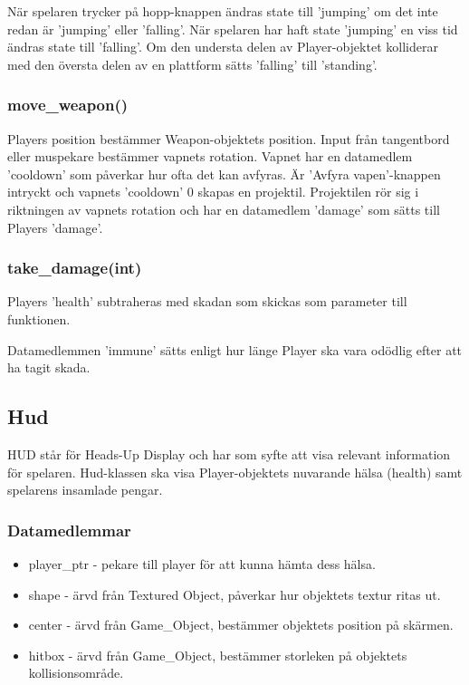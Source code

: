 \documentclass{TDP005mall}
\begin{document}
När spelaren trycker på hopp-knappen ändras state till 'jumping' om det inte redan är 'jumping' eller 'falling'.
När spelaren har haft state 'jumping' en viss tid ändras state till 'falling'.
Om den understa delen av Player-objektet kolliderar med den översta delen av en plattform sätts 'falling' till 'standing'.

\subsubsection{move\_weapon()}
Players position bestämmer Weapon-objektets position. 
Input från tangentbord eller muspekare bestämmer vapnets rotation.
Vapnet har en datamedlem 'cooldown' som påverkar hur ofta det kan avfyras. 
Är 'Avfyra vapen'-knappen intryckt och vapnets 'cooldown' 0 skapas en projektil.
Projektilen rör sig i riktningen av vapnets rotation och har en datamedlem 'damage' som sätts till Players 'damage'.

\subsubsection{take\_damage(int)}
Players 'health' subtraheras med skadan som skickas som parameter till funktionen. 

Datamedlemmen 'immune' sätts enligt hur länge Player ska vara odödlig efter att ha tagit skada.


\subsection{Hud}
HUD står för Heads-Up Display och har som syfte att visa relevant information för spelaren. 
Hud-klassen ska visa Player-objektets nuvarande hälsa (health) samt spelarens insamlade pengar.

\subsubsection{Datamedlemmar}
\begin{itemize}
\item player\_ptr - pekare till player för att kunna hämta dess hälsa.
\item shape - ärvd från Textured Object, påverkar hur objektets textur ritas ut.
\item center - ärvd från Game\_Object, bestämmer objektets position på skärmen.
\item hitbox - ärvd från Game\_Object, bestämmer storleken på objektets kollisionsområde.
\end{itemize}
\end{document}
